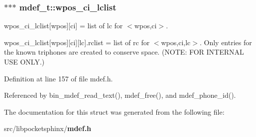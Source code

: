\subsubsection[{wpos\-\_\-ci\-\_\-lclist}]{$\ast$$\ast$$\ast$ mdef\-\_\-t\-::wpos\-\_\-ci\-\_\-lclist}\label{structmdef__t_a5dd5c3d3058a314f4c971a14d1df5f38}


wpos\-\_\-ci\-\_\-lclist[wpos][ci] = list of lc for $<$wpos,ci$>$. 

wpos\-\_\-ci\-\_\-lclist[wpos][ci][lc].rclist = list of rc for $<$wpos,ci,lc$>$. Only entries for the known triphones are created to conserve space. (N\-O\-T\-E\-: F\-O\-R I\-N\-T\-E\-R\-N\-A\-L U\-S\-E O\-N\-L\-Y.) 

Definition at line 157 of file mdef.\-h.



Referenced by bin\-\_\-mdef\-\_\-read\-\_\-text(), mdef\-\_\-free(), and mdef\-\_\-phone\-\_\-id().



The documentation for this struct was generated from the following file\-:\begin{DoxyCompactItemize}
\item 
src/libpocketsphinx/{\bf mdef.\-h}\end{DoxyCompactItemize}
